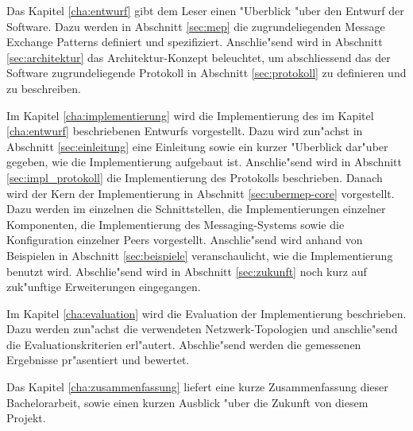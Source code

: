 Das Kapitel \ref{cha:entwurf} gibt dem Leser einen "Uberblick "uber den Entwurf der Software. Dazu werden in Abschnitt \ref{sec:mep} die zugrundeliegenden Message Exchange Patterns definiert und spezifiziert. Anschlie"send wird in Abschnitt \ref{sec:architektur} das Architektur-Konzept beleuchtet, um abschliessend das der Software zugrundeliegende Protokoll in Abschnitt \ref{sec:protokoll} zu definieren und zu beschreiben.

Im Kapitel \ref{cha:implementierung} wird die Implementierung des im Kapitel \ref{cha:entwurf} beschriebenen Entwurfs vorgestellt. Dazu wird zun"achst in Abschnitt \ref{sec:einleitung} eine Einleitung sowie ein kurzer "Uberblick dar"uber gegeben, wie die Implementierung aufgebaut ist. Anschlie"send wird in Abschnitt \ref{sec:impl_protokoll} die Implementierung des Protokolls beschrieben. Danach wird der Kern der Implementierung in Abschnitt \ref{sec:ubermep-core} vorgestellt. Dazu werden im einzelnen die Schnittstellen, die Implementierungen einzelner Komponenten, die Implementierung des Messaging-Systems sowie die Konfiguration einzelner Peers vorgestellt. Anschlie"send wird anhand von Beispielen in Abschnitt \ref{sec:beispiele} veranschaulicht, wie die Implementierung benutzt wird. Abschlie"send wird in Abschnitt \ref{sec:zukunft} noch kurz auf zuk"unftige Erweiterungen eingegangen.

Im Kapitel \ref{cha:evaluation} wird die Evaluation der Implementierung beschrieben. Dazu werden zun"achst die verwendeten Netzwerk-Topologien und anschlie"send die Evaluationskriterien erl"autert. Abschlie"send werden die gemessenen Ergebnisse pr"asentiert und bewertet.

Das Kapitel \ref{cha:zusammenfassung} liefert eine kurze Zusammenfassung dieser Bachelorarbeit, sowie einen kurzen Ausblick "uber die Zukunft von diesem Projekt.